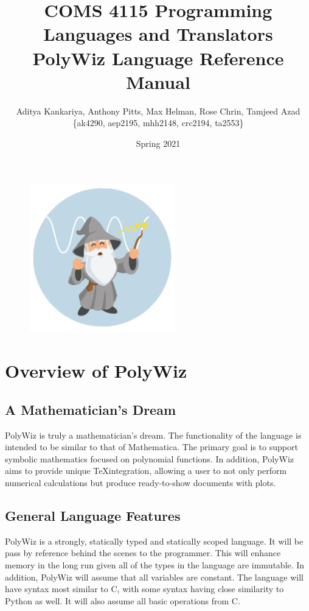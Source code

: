 \documentclass{article}
\title{COMS 4115 Programming Languages and Translators \\ PolyWiz Language Reference Manual}
\author{Aditya Kankariya, Anthony Pitts, Max Helman, Rose Chrin, Tamjeed Azad\\ \{ak4290, aep2195, mhh2148, crc2194, ta2553\}}
\date{Spring 2021}
\begin{document}
\maketitle
\begin{figure}[!h]
\centering
\includegraphics[width=2.5in]{polywizard.png}
\label{fig_sim}
\end{figure}
\maketitle
\tableofcontents

\section{Overview of PolyWiz}
\subsection{A Mathematician's Dream}
PolyWiz is truly a mathematician's dream. The functionality of the language is intended to be similar to that of Mathematica. The primary goal is to support symbolic mathematics focused on polynomial functions. In addition, PolyWiz aims to provide unique \TeX\text{ }integration, allowing a user to not only perform numerical calculations but produce ready-to-show documents with plots. 

\subsection{General Language Features}

PolyWiz is a strongly, statically typed and statically scoped language. It will be pass by reference behind the scenes to the programmer. This will enhance memory in the long run given all of the types in the language are immutable. In addition, PolyWiz will assume that all variables are constant. The language will have syntax most similar to C, with some syntax having close similarity to Python as well. It will also assume all basic operations from C. 
\end{document}
